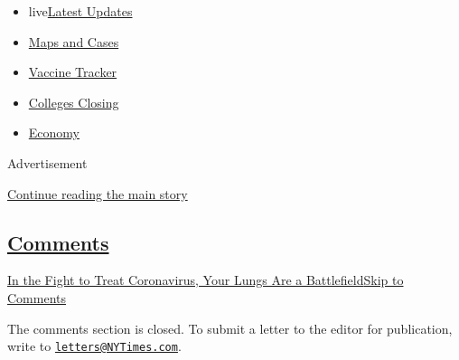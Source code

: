 \begin{itemize}
\tightlist
\item
  live\href{https://www.nytimes3xbfgragh.onion/2020/08/20/world/coronavirus-covid.html?name=styln-coronavirus-national\&region=TOP_BANNER\&variant=undefined\&block=storyline_menu_recirc\&action=click\&pgtype=Interactive\&impression_id=a2773011-e38f-11ea-a918-111100de9fdb}{Latest
  Updates}
\item
  \href{https://www.nytimes3xbfgragh.onion/interactive/2020/us/coronavirus-us-cases.html?name=styln-coronavirus-national\&region=TOP_BANNER\&variant=undefined\&block=storyline_menu_recirc\&action=click\&pgtype=Interactive\&impression_id=a2773012-e38f-11ea-a918-111100de9fdb}{Maps
  and Cases}
\item
  \href{https://www.nytimes3xbfgragh.onion/interactive/2020/science/coronavirus-vaccine-tracker.html?name=styln-coronavirus-national\&region=TOP_BANNER\&variant=undefined\&block=storyline_menu_recirc\&action=click\&pgtype=Interactive\&impression_id=a2773013-e38f-11ea-a918-111100de9fdb}{Vaccine
  Tracker}
\item
  \href{https://www.nytimes3xbfgragh.onion/2020/08/19/us/colleges-closing-covid.html?name=styln-coronavirus-national\&region=TOP_BANNER\&variant=undefined\&block=storyline_menu_recirc\&action=click\&pgtype=Interactive\&impression_id=a2773014-e38f-11ea-a918-111100de9fdb}{Colleges
  Closing}
\item
  \href{https://www.nytimes3xbfgragh.onion/live/2020/08/20/business/stock-market-today-coronavirus?name=styln-coronavirus-national\&region=TOP_BANNER\&variant=undefined\&block=storyline_menu_recirc\&action=click\&pgtype=Interactive\&impression_id=a2775720-e38f-11ea-a918-111100de9fdb}{Economy}
\end{itemize}

Advertisement

\protect\hyperlink{after-top}{Continue reading the main story}

\hypertarget{comments}{%
\subsection{\texorpdfstring{\protect\hyperlink{commentsContainer}{Comments}}{Comments}}\label{comments}}

\href{}{In the Fight to Treat Coronavirus, Your Lungs Are a
Battlefield}\href{}{Skip to Comments}

The comments section is closed. To submit a letter to the editor for
publication, write to
\href{mailto:letters@NYTimes.com}{\nolinkurl{letters@NYTimes.com}}.

